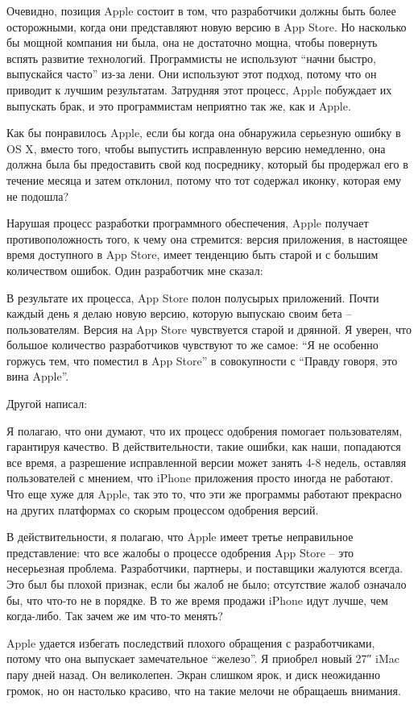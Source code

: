 \documentclass[ebook,12pt,oneside,openany]{memoir}
\begin{document}
Очевидно, позиция Apple состоит в том, что разработчики должны быть
более осторожными, когда они представляют новую версию в App Store. Но
насколько бы мощной компания ни была, она не достаточно мощна, чтобы
повернуть вспять развитие технологий. Программисты не используют
“начни быстро, выпускайся часто” из-за лени. Они используют этот
подход, потому что он приводит к лучшим результатам. Затрудняя этот
процесс, Apple побуждает их выпускать брак, и это программистам
неприятно так же, как и Apple.

Как бы понравилось Apple, если бы когда она обнаружила серьезную
ошибку в OS X, вместо того, чтобы выпустить исправленную версию
немедленно, она должна была бы предоставить свой код посреднику,
который бы продержал его в течение месяца и затем отклонил, потому что
тот содержал иконку, которая ему не подошла?

Нарушая процесс разработки программного обеспечения, Apple получает
противоположность того, к чему она стремится: версия приложения, в
настоящее время доступного в App Store, имеет тенденцию быть старой и
с большим количеством ошибок. Один разработчик мне сказал:

В результате их процесса, App Store полон полусырых приложений. Почти
каждый день я делаю новую версию, которую выпускаю своим бета –
пользователям. Версия на App Store чувствуется старой и дрянной. Я
уверен, что большое количество разработчиков чувствуют то же самое: “Я
не особенно горжусь тем, что поместил в App Store” в совокупности с
“Правду говоря, это вина Apple”.

Другой написал:

Я полагаю, что они думают, что их процесс одобрения помогает
пользователям, гарантируя качество. В действительности, такие ошибки,
как наши, попадаются все время, а разрешение исправленной версии может
занять 4-8 недель, оставляя пользователей с мнением, что iPhone
приложения просто иногда не работают. Что еще хуже для Apple, так это
то, что эти же программы работают прекрасно на других платформах со
скорым процессом одобрения версий.

В действительности, я полагаю, что Apple имеет третье неправильное
представление: что все жалобы о процессе одобрения App Store – это
несерьезная проблема. Разработчики, партнеры, и поставщики жалуются
всегда. Это был бы плохой признак, если бы жалоб не было; отсутствие
жалоб означало бы, что что-то не в порядке. В то же время продажи
iPhone идут лучше, чем когда-либо. Так зачем же им что-то менять?

Apple удается избегать последствий плохого обращения с разработчиками,
потому что она выпускает замечательное “железо”. Я приобрел новый 27″
iMac пару дней назад. Он великолепен. Экран слишком ярок, и диск
неожиданно громок, но он настолько красиво, что на такие мелочи не
обращаешь внимания.
\end{document}
